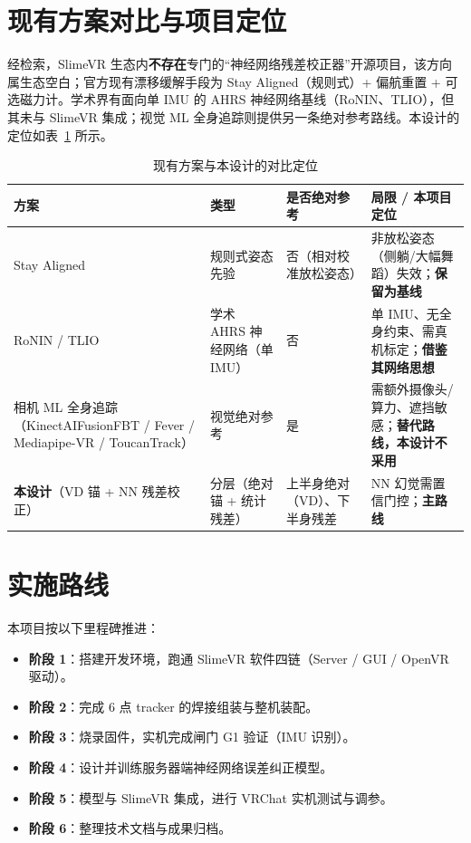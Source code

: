 \documentclass[scheme=plain,UTF8,11pt,a4paper]{ctexart}
\begin{document}
\section{现有方案对比与项目定位}
\label{sec:compare}

经检索，SlimeVR 生态内\textbf{不存在}专门的“神经网络残差校正器”开源项目，该方向属生态空白；官方现有漂移缓解手段为 Stay Aligned（规则式）+ 偏航重置 + 可选磁力计。学术界有面向单 IMU 的 AHRS 神经网络基线（RoNIN、TLIO），但其未与 SlimeVR 集成；视觉 ML 全身追踪则提供另一条绝对参考路线。本设计的定位如表~\ref{tab:compare} 所示。

\begin{table}[H]
\centering
\small
\caption{现有方案与本设计的对比定位}
\label{tab:compare}
\begin{tabular}{p{3.0cm}p{2.6cm}p{2.0cm}p{4.0cm}}
\toprule
\textbf{方案} & \textbf{类型} & \textbf{是否绝对参考} & \textbf{局限 / 本项目定位} \\
\midrule
Stay Aligned & 规则式姿态先验 & 否（相对校准放松姿态） & 非放松姿态（侧躺/大幅舞蹈）失效；\textbf{保留为基线} \\
RoNIN / TLIO & 学术 AHRS 神经网络（单 IMU） & 否 & 单 IMU、无全身约束、需真机标定；\textbf{借鉴其网络思想} \\
相机 ML 全身追踪（KinectAIFusionFBT / Fever / Mediapipe-VR / ToucanTrack） & 视觉绝对参考 & 是 & 需额外摄像头/算力、遮挡敏感；\textbf{替代路线，本设计不采用} \\
\textbf{本设计}（VD 锚 + NN 残差校正） & 分层（绝对锚 + 统计残差） & 上半身绝对（VD）、下半身残差 & NN 幻觉需置信门控；\textbf{主路线} \\
\bottomrule
\end{tabular}
\end{table}

\section{实施路线}
\label{sec:roadmap}

本项目按以下里程碑推进：

\begin{itemize}
    \item \textbf{阶段 1}：搭建开发环境，跑通 SlimeVR 软件四链（Server / GUI / OpenVR 驱动）。
    \item \textbf{阶段 2}：完成 6 点 tracker 的焊接组装与整机装配。
    \item \textbf{阶段 3}：烧录固件，实机完成闸门 G1 验证（IMU 识别）。
    \item \textbf{阶段 4}：设计并训练服务器端神经网络误差纠正模型。
    \item \textbf{阶段 5}：模型与 SlimeVR 集成，进行 VRChat 实机测试与调参。
    \item \textbf{阶段 6}：整理技术文档与成果归档。
\end{itemize}
\end{document}
